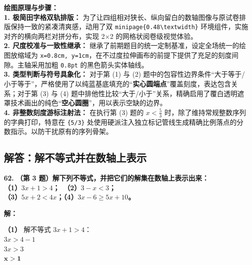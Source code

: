 \vspace{0.4cm}
{\small\color{blue!70!black}
\textbf{绘图原理与步骤：}\\
\textbf{1. 极简田字格双轨排版：} 为了让四组相对狭长、纵向留白的数轴图像与原试卷排版保持一致的紧凑清爽感，动用了双 \texttt{minipage\{0.48\textbackslash textwidth\}} 环境组件，实施对齐的横向两栏对拼分布，实现 2$\times$2 的网格状阅卷级视觉体验。\\
\textbf{2. 尺度校准与一致性继承：} 继承了前期题目的统一定制基准，设定全场统一的绘图放缩域为 \texttt{x=0.8cm, y=1cm}，在不过度拉伸画布的前提下提供了充足的刻度间隙。主轴采用加粗 \texttt{0.8pt} 的黑色箭头实体轴线。\\
\textbf{3. 类型判断与符号具象化：} 对于第 (1) 与 (2) 题中的包容性边界条件“大于等于/小于等于”，严格使用了以纯蓝基底填充的“\textbf{实心圆端点}”覆盖刻度，表达包含关系；对于第 (3) 与 (4) 题中排他性比较“大于/小于”关系，精确启用了覆白透明遮罩技术画出的纯色“\textbf{空心圆圈}”，用以表示空缺的边界。\\
\textbf{4. 非整数刻度游标注射法：} 在执行第 (3) 题的 $x < \frac{5}{3}$ 时，除了维持常规整数序列的字典打印，特意在 \texttt{\{5/3\}} 处使用硬派注入独立标记管线生成精确比例落点的分数指示。以防干扰原有的序列骨架。
}

\newpage

\newpage

\subsection{解答：解不等式并在数轴上表示}

\vspace{0.6cm}

\textbf{\LARGE 62.} \textbf{（第 3 题）解下列不等式，并把它们的解集在数轴上表示出来：\\
（1）$3x+1 > 4$；\qquad\qquad\quad\, （2）$3-x < 3$；\\
（3）$5x+2 < 4x$；\qquad\qquad\quad （4）$3x-6 \geqslant 5x+10$。}

\vspace{0.4cm}
\textbf{解：}

\textbf{（1）} 解不等式 $3x+1 > 4$：\\
\hspace*{0.8cm} $3x > 4 - 1$\\
\hspace*{0.8cm} $3x > 3$\\
\hspace*{0.8cm} $\boldsymbol{x > 1}$

